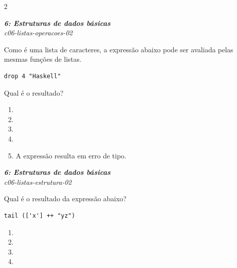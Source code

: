 \documentclass[a4paper,10pt,brazil]{article}
\begin{document}
\begin{multicols}{2}
\begin{enumerate}
\end{enumerate}

\begin{flushright}
  \footnotesize
  \textit{\textbf{6: Estruturas de dados básicas}}\\
  \textit{c06-listas-operacoes-02}\\

\end{flushright}
Como  é uma lista de caracteres, a expressão abaixo pode ser avaliada pelas mesmas funções de listas.
\begin{verbatim}
drop 4 "Haskell"
\end{verbatim}
Qual é o resultado?

\begin{enumerate}
  \item {}

  \item {}

  \item {}

  \item {}

  \item A expressão resulta em erro de tipo.


\end{enumerate}

\begin{flushright}
  \footnotesize
  \textit{\textbf{6: Estruturas de dados básicas}}\\
  \textit{c06-listas-estrutura-02}\\

\end{flushright}
Qual é o resultado da expressão abaixo?
\begin{verbatim}
tail (['x'] ++ "yz")
\end{verbatim}

\begin{enumerate}
  \item {}

  \item {}

  \item {}

  \item {}


\end{enumerate}
\end{multicols}
\end{document}
